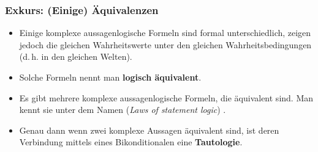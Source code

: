 \begin{frame}
\frametitle{Exkurs: (Einige) Äquivalenzen}

\begin{itemize}
	\item Einige komplexe aussagenlogische Formeln sind formal unterschiedlich, zeigen jedoch die gleichen Wahrheitswerte unter den gleichen Wahrheitsbedingungen (d.\,h. in den gleichen Welten). 
\medskip
	\item Solche Formeln nennt man \textbf{logisch äquivalent}. 
\medskip	
	\item Es gibt mehrere komplexe aussagenlogische Formeln, die äquivalent sind. Man kennt sie unter dem Namen  (\textit{Laws of statement logic})  \citep[vgl.][]{Partee&Co93a}.
\medskip	
	\item Genau dann wenn zwei komplexe Aussagen äquivalent sind, ist deren Verbindung mittels eines Bikonditionalen eine \textbf{Tautologie}.

\end{itemize}


\end{frame}


